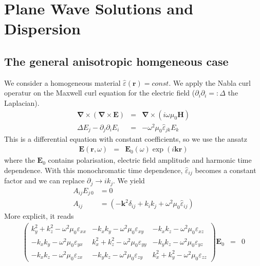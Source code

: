 \documentclass[12pt,a4paper,twoside,openright,BCOR10mm,headsepline,titlepage,abstracton,chapterprefix,final]{scrreprt}
\newcommand\Vector[1]{{\mathbf{#1}}}
\newcommand\vacuum{0}
\newcommand\Location{\Vector{r}}
\newcommand\wavenumber{k}
\newcommand\Wavevector{\Vector{\wavenumber}}
\newcommand\Nabla{\Vector{\nabla}}
\newcommand\Tensor[1]{\hat{#1}}
\newcommand\scalarEfield{E}
\newcommand\scalarHfield{H}
\newcommand\Efield{\Vector{\scalarEfield}}
\newcommand\Hfield{\Vector{\scalarHfield}}
\newcommand\vacuumpermeability{\scalarpermeability_{\vacuum}}
\newcommand\scalarpermeability{\mu}
\newcommand\permittivity{\Tensor{\scalarpermittivity}}
\newcommand\scalarpermittivity{\varepsilon}
\begin{document}
\section{Plane Wave Solutions and Dispersion}
\subsection{The general anisotropic homgeneous case}
We consider a homogeneous material $\permittivity(\Location) = const.$ We apply the Nabla curl operatur on the Maxwell curl equation for the electric field
($\partial_i \partial_i =: \Delta$ the Laplacian). 
\begin{eqnarray}
  \Nabla \times ( \Nabla \times \Efield ) &=& \Nabla \times ( i \omega \vacuumpermeability \Hfield ) 
  \\
  \Delta \scalarEfield_j - \partial_j \partial_i \scalarEfield_i &=& - \omega^2 \vacuumpermeability \permittivity_{jk} \scalarEfield_{k}
\end{eqnarray}
This is a differential equation with constant coefficients, so we use the ansatz
\begin{eqnarray}
 \Efield(\Location,\omega) &=& \Efield_0(\omega) \exp(i \Wavevector \Location)
\end{eqnarray}
where the $\Efield_0$ contains polarisation, electric field amplitude and harmonic time dependence.
With this monochromatic time dependence, $\permittivity_{ij}$ becomes a constant factor 
and we can replace $\partial_j \to i k_j$. We yield
\begin{align}
 A_{ij} E_{j\,0} &= 0 \label{eq:generalDispersionEigenEquationindex}\\
 A_{ij}          &= \left(-\Vector{k}^2 \delta_{ij} + k_i k_j + \omega^2 \vacuumpermeability \permittivity_{ij} \right)
 \end{align}
More explicit, it reads
\begin{eqnarray}
\begin{pmatrix}
 \wavenumber_y^2 + \wavenumber_z^2 - \omega^2 \vacuumpermeability \scalarpermittivity_{xx} 
 &
 - \wavenumber_x \wavenumber_y - \omega^2 \vacuumpermeability \scalarpermittivity_{xy}
 &
 - \wavenumber_x \wavenumber_z - \omega^2 \vacuumpermeability \scalarpermittivity_{xz}
 \\
 - \wavenumber_x \wavenumber_y - \omega^2 \vacuumpermeability \scalarpermittivity_{yx}
 &
 \wavenumber_x^2 + \wavenumber_z^2 - \omega^2 \vacuumpermeability \scalarpermittivity_{yy} 
 &
 - \wavenumber_y \wavenumber_z - \omega^2 \vacuumpermeability \scalarpermittivity_{yz}
 \\
 - \wavenumber_x \wavenumber_z - \omega^2 \vacuumpermeability \scalarpermittivity_{zx}
 &
 - \wavenumber_y \wavenumber_z - \omega^2 \vacuumpermeability \scalarpermittivity_{zy}
 &
 \wavenumber_x^2 + \wavenumber_y^2 - \omega^2 \vacuumpermeability \scalarpermittivity_{zz}  
\end{pmatrix}
\Efield_0
&=& 0 \label{eq:generalDispersionEigenEquation}
\end{eqnarray}
\end{document}
